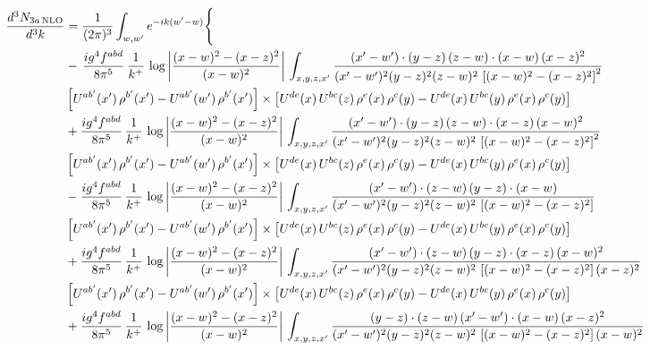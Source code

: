 \documentclass[9pt]{article}
\numberwithin{equation}{section}
\begin{document}
\begin{align}
\frac{d^{3}N_{3a\,\rm NLO}}{d^{3}k} & = \frac{1}{(2\pi)^{3}}\int_{w,w'}e^{-ik(w'-w)}\Bigg\{\notag \\
& -\,\frac{ig^{4}f^{abd}}{8\pi^{5}}\,\frac{1}{k^{+}}\,\log{\left|\frac{(x-w)^{2}-(x-z)^{2}}{(x-w)^{2}}\right|}\,\int_{x,y,z,x'}
\frac{(x'-w')\cdot(y-z)\,(z-w)\cdot(x-w)\,(x-z)^{2}}{(x'-w')^{2}(y-z)^{2}(z-w)^{2}\,\left[(x-w)^{2}-(x-z)^{2}\right]^{2}}\notag \\ & \left[U^{ab'}(x')\,\rho^{b'}(x')-U^{ab'}(w')\, \rho^{b'}(x')\right]\times \left[U^{de}(x)\,U^{bc}(z)\, \rho^{e}(x)\,\rho^{c}(y)-U^{de}(x)\,U^{bc}(y)\,\rho^{e}(x)\,\rho^{c}(y)\right] \notag \\
& +\frac{ig^{4}f^{abd}}{8\pi^{5}}\,\frac{1}{k^{+}}\,\log{\left|\frac{(x-w)^{2}-(x-z)^{2}}{(x-w)^{2}}\right|}\,\int_{x,y,z,x'}
\frac{(x'-w')\cdot(y-z)\,(z-w)\cdot(x-z)\,(x-w)^{2}}{(x'-w')^{2}(y-z)^{2}(z-w)^{2}\,\left[(x-w)^{2}-(x-z)^{2}\right]^{2}}\notag \\ 
&\left[U^{ab'}(x')\,\rho^{b'}(x')-U^{ab'}(w')\, \rho^{b'}(x')\right]\times \left[U^{de}(x)\,U^{bc}(z)\, \rho^{e}(x)\,\rho^{c}(y)-U^{de}(x)\,U^{bc}(y)\,\rho^{e}(x)\,\rho^{c}(y)\right] \notag \\
& -\frac{ig^{4}f^{abd}}{8\pi^{5}}\,\frac{1}{k^{+}}\,\log{\left|\frac{(x-w)^{2}-(x-z)^{2}}{(x-w)^{2}}\right|}\,\int_{x,y,z,x'}
\frac{(x'-w')\cdot(z-w)\,(y-z)\cdot(x-w)}{(x'-w')^{2}(y-z)^{2}(z-w)^{2}\,\left[(x-w)^{2}-(x-z)^{2}\right]}\notag \\ & \left[U^{ab'}(x')\,\rho^{b'}(x')-U^{ab'}(w')\, \rho^{b'}(x')\right]\times \left[U^{de}(x)\,U^{bc}(z)\, \rho^{e}(x)\,\rho^{c}(y)-U^{de}(x)\,U^{bc}(y)\,\rho^{e}(x)\,\rho^{c}(y)\right] \notag \\
&  +\frac{ig^{4}f^{abd}}{8\pi^{5}}\,\frac{1}{k^{+}}\,\log{\left|\frac{(x-w)^{2}-(x-z)^{2}}{(x-w)^{2}}\right|}\,\int_{x,y,z,x'}
\frac{(x'-w')\cdot(z-w)\,(y-z)\cdot(x-z)\,(x-w)^{2}}{(x'-w')^{2}(y-z)^{2}(z-w)^{2}\,\left[(x-w)^{2}-(x-z)^{2}\right](x-z)^{2}}\notag \\ & \left[U^{ab'}(x')\,\rho^{b'}(x')-U^{ab'}(w')\, \rho^{b'}(x')\right]\times \left[U^{de}(x)\,U^{bc}(z)\, \rho^{e}(x)\,\rho^{c}(y)-U^{de}(x)\,U^{bc}(y)\,\rho^{e}(x)\,\rho^{c}(y)\right] \notag \\
& +\frac{ig^{4}f^{abd}}{8\pi^{5}}\,\frac{1}{k^{+}}\,\log{\left|\frac{(x-w)^{2}-(x-z)^{2}}{(x-w)^{2}}\right|}\,\int_{x,y,z,x'}
\frac{(y-z)\cdot(z-w)\,(x'-w')\cdot(x-w)\,(x-z)^{2}}{(x'-w')^{2}(y-z)^{2}(z-w)^{2}\,\left[(x-w)^{2}-(x-z)^{2}\right](x-w)^{2}}\notag \\ 

\end{align}
\end{document}

